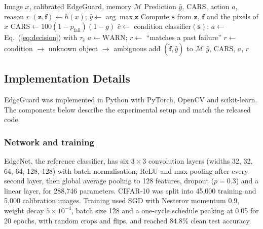 \documentclass[conference]{IEEEtran}
\begin{document}
\begin{algorithm}[t]
\caption{EdgeGuard single-pass inference}
\label{alg:infer}
\begin{algorithmic}[1]
\Require Image $x$, calibrated EdgeGuard, memory $\mathcal{M}$
\Ensure Prediction $\hat{y}$, CARS, action $a$, reason $r$
\State $(\mathbf{z},\mathbf{f})\gets h(x)$; $\hat{y}\gets\arg\max\mathbf{z}$ 
\State Compute $\mathbf{s}$ from $\mathbf{z}$, $\mathbf{f}$ and the pixels of $x$
\State $\text{CARS}\gets100(1-p_{\text{fail}})(1-g)$ 
\State $\hat{c}\gets$ condition classifier$(\mathbf{s})$; $a\gets$ Eq.~(\ref{eq:decision}) with $\tau_{\hat{c}}$
  \State $a\gets\text{WARN}$; $r\gets$ ``matches a past failure''
  \State $r\gets$ condition $\rightarrow$ unknown object $\rightarrow$ ambiguous
\EndIf
{}
  \State add $(\tilde{\mathbf{f}},\hat{y})$ to $\mathcal{M}$
\EndIf
\State \Return $\hat{y}$, CARS, $a$, $r$
\end{algorithmic}
\end{algorithm}

\subsection{Implementation Details}

EdgeGuard was implemented in Python with PyTorch, OpenCV and scikit-learn. The components below describe the experimental setup and match the released code.

\subsubsection{Network and training}
EdgeNet, the reference classifier, has six $3\times3$ convolution layers (widths 32, 32, 64, 64, 128, 128) with batch normalisation, ReLU and max pooling after every second layer, then global average pooling to 128 features, dropout ($p=0.3$) and a linear layer, for 288{,}746 parameters. CIFAR-10 \cite{krizhevsky2009cifar} was split into 45{,}000 training and 5{,}000 calibration images. Training used SGD with Nesterov momentum 0.9, weight decay $5\times10^{-4}$, batch size 128 and a one-cycle schedule peaking at 0.05 for 20 epochs, with random crops and flips, and reached 84.8\% clean test accuracy.
\end{document}

